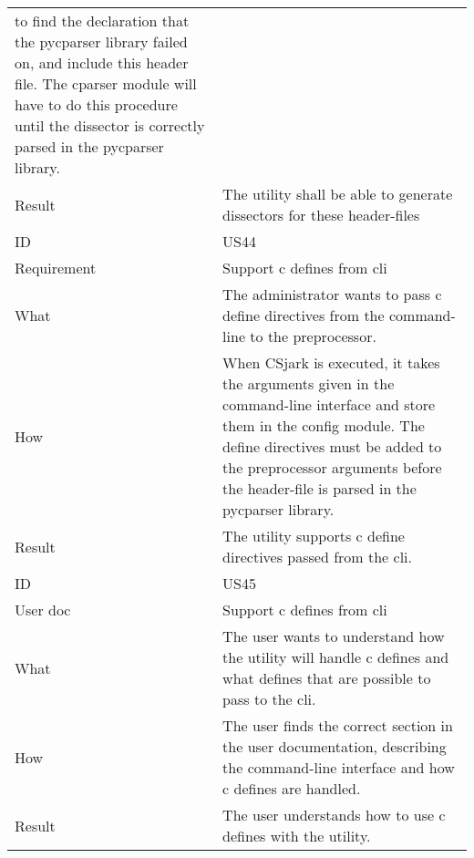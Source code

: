 \begin{table}[htbp]
{\begin{tabularx}{1.2\textwidth}{l X}
	to find the declaration that the \gls{pycparser} \gls{library} failed on, and include this \gls{header} file. The cparser module will have to do this procedure until the \gls{dissector} is correctly parsed in the \gls{pycparser} \gls{library}. \\
	Result & The \gls{utility} shall be able to generate \glspl{dissector} for these \gls{header}-files \\	
	\midrule
	ID & US44 \\
	Requirement & Support \Gls{c} \glspl{define} from \gls{cli}  \\
	What & The administrator wants to pass \Gls{c} \gls{define} directives from the command-line to the \gls{preprocessor}.   \\
	How & When CSjark is executed, it takes the arguments given in the command-line interface and store them in the config module.
	The \gls{define} directives must be added to the \gls{preprocessor} arguments before the \gls{header}-file is parsed in the \gls{pycparser} \gls{library}.   \\
	Result & The \gls{utility} supports \Gls{c} \gls{define} directives passed from the \gls{cli}. \\
	\midrule
	ID & US45 \\
	User doc & Support \Gls{c} \glspl{define} from \gls{cli} \\
	What & The user wants to understand how the \gls{utility} will handle \Gls{c} \glspl{define} and what \glspl{define} that are possible to pass to the \gls{cli}.   \\
	How & The user finds the correct section in the user documentation, describing the command-line interface and how \Gls{c} \glspl{define} are handled.  \\
	Result & The user understands how to use \Gls{c} \glspl{define} with the \gls{utility}. \\
	\bottomrule
\end{tabularx}}
\end{table}

